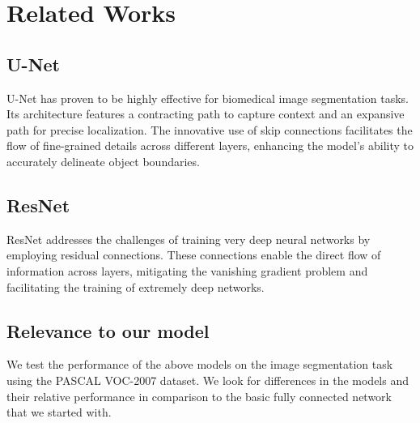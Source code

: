 \section*{Related Works}

\subsection*{U-Net} 
U-Net \cite{unet} has proven to be highly effective for biomedical image segmentation tasks. Its architecture features a contracting path to capture context and an expansive path for precise localization. The innovative use of skip connections facilitates the flow of fine-grained details across different layers, enhancing the model's ability to accurately delineate object boundaries.


\subsection*{ResNet} 
ResNet \cite{resnet} addresses the challenges of training very deep neural networks by employing residual connections. These connections enable the direct flow of information across layers, mitigating the vanishing gradient problem and facilitating the training of extremely deep networks.

\subsection*{Relevance to our model} 
We test the performance of the above models on the image segmentation task using the PASCAL VOC-2007 dataset. We look for differences in the models and their relative performance in comparison to the basic fully connected network that we started with.

